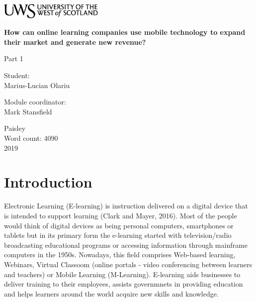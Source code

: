 \documentclass[11]{article}
\begin{document}
\begin{titlepage}
	\begin{center}	
		\includegraphics[width = 5cm,height = 1.5cm]{uws_logo.png}\\[5cm]
	
{ \huge \bfseries %
		How can online learning companies use mobile technology to expand their market and generate new revenue?\\ \Large 
}
	\vspace{2cm}
	
	{\huge
		Part 1 
	}

	\vspace{2cm}			
			
		\begin{flushright}
				\large Student:\\
				Marius-Lucian Olariu\\[1cm]
		\end{flushright}
		
	
		\begin{flushleft}
			 \large
				Module coordinator: \\
				Mark Stansfield \\[1cm]
		\end{flushleft}
		
	\vspace{2cm}	
	
		
		\vfill
		
		{\large {Paisley \\ Word count: 4090 \\ 2019}}
		\end{center}
\end{titlepage}

\newpage

\tableofcontents

\listoffigures

\listoftables

\newpage
\section{Introduction}

		Electronic Learning (E-learning) is instruction delivered on a digital device that is intended to support learning (Clark and Mayer, 2016). Most of the people would think of digital devices as being personal computers, smartphones or tablets but  in its primary form the e-learning started with television/radio broadcasting  educational programs or accessing information through mainframe computers in the 1950s. Nowadays, this field comprises Web-based learning, Webinars, Virtual Classoom (online portals - video conferencing between learners and teachers) or Mobile Learning (M-Learning). E-learning  aids businesses to deliver training to their employees, assists governmnets in providing education  and helps learners around the world acquire new skills and knowledge.\\
\end{document}
